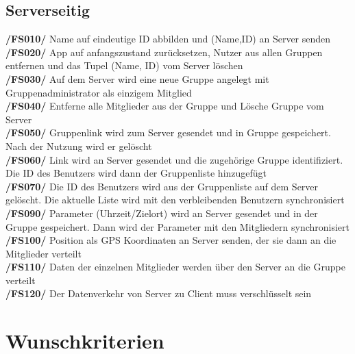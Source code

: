 \subsection{Serverseitig}
     \textbf{/FS010/} Name auf eindeutige ID abbilden und (Name,ID) an Server senden\\
     \textbf{/FS020/} App auf anfangszustand zurücksetzen, Nutzer aus allen Gruppen entfernen und das Tupel (Name, ID) vom Server löschen \\
     \textbf{/FS030/} Auf dem Server wird eine neue Gruppe angelegt mit Gruppenadministrator als einzigem Mitglied\\
     \textbf{/FS040/} Entferne alle Mitglieder aus der Gruppe und Lösche Gruppe vom Server\\
     \textbf{/FS050/} Gruppenlink wird zum Server gesendet und in Gruppe gespeichert. Nach der Nutzung wird er gelöscht\\
     \textbf{/FS060/} Link wird an Server gesendet und die zugehörige Gruppe identifiziert.\\ Die ID des Benutzers wird dann der Gruppenliste hinzugefügt\\
     \textbf{/FS070/} Die ID des Benutzers wird aus der Gruppenliste auf dem Server gelöscht. Die aktuelle Liste wird mit den verbleibenden Benutzern synchronisiert\\
     \textbf{/FS090/} Parameter (Uhrzeit/Zielort) wird an Server gesendet und in der Gruppe gespeichert. Dann wird der Parameter mit den Mitgliedern synchronisiert \\
     \textbf{/FS100/} Position als GPS Koordinaten an Server senden, der sie dann an die Mitglieder verteilt\\
     \textbf{/FS110/} Daten der einzelnen Mitglieder werden über den Server an die Gruppe verteilt \\
     \textbf{/FS120/} Der Datenverkehr von Server zu Client muss verschlüsselt sein\\

\section{Wunschkriterien}
